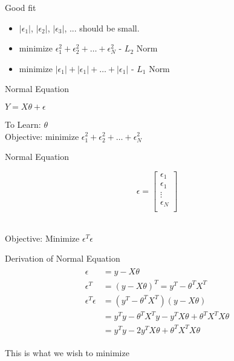 \documentclass{beamer}
\begin{document}
\begin{frame}{Good fit}

\begin{itemize}
    \item<+-> $|\epsilon_{1}|$, $|\epsilon_{2}|$, $|\epsilon_{3}|$, ... should be small.
    \item<+-> 
${\text{minimize }} \epsilon_{1}^2 + \epsilon_{2}^2 + \dots + \epsilon_{N}^2$ - $L_{2}$ Norm
    \item<+-> 
${\text{minimize }} |\epsilon_{1}| + |\epsilon_{1}| + \dots + |\epsilon_{1}|$ - $L_{1}$ Norm
\end{itemize}
\end{frame}





\begin{frame}{Normal Equation}
    
    
   \pause  \begin{tcolorbox}
       $ Y = X\theta + \epsilon$
    \end{tcolorbox}
    
    \pause To Learn: $\theta$ \\
    \pause Objective: ${\text{minimize }} \epsilon_{1}^2 + \epsilon_{2}^2 + \dots + \epsilon_{N}^2$  
\end{frame}

\begin{frame}{Normal Equation}
    
\begin{equation*}
 \epsilon = 
\begin{bmatrix}
    \epsilon_{1} \\
    \epsilon_{1} \\
    \vdots \\
    \epsilon_{N} \\
\end{bmatrix}
\end{equation*}
\\
\begin{center}
 \pause Objective:   Minimize $\epsilon^{T}\epsilon$    
\end{center}
\end{frame}

\begin{frame}{Derivation of Normal Equation}
\begin{align*}
\label{eqn*:eqlabel}
\begin{split}
   \epsilon &= y - X\theta \\ 
\epsilon^{T} &= (y-X\theta)^{T} = y^{T} - \theta^{T}X^{T}\\
\epsilon^{T}\epsilon &= (y^{T} - \theta^{T}X^{T})(y - X\theta)\\
&=y^{T}y - \theta^{T}X^{T}y - y^{T}X\theta+\theta^{T}X^{T}X\theta\\
&=y^{T}y - 2y^{T}X\theta+\theta^{T}X^{T}X\theta
\end{split}
\end{align*}

This is what we wish to minimize
\end{frame}
\end{document}
